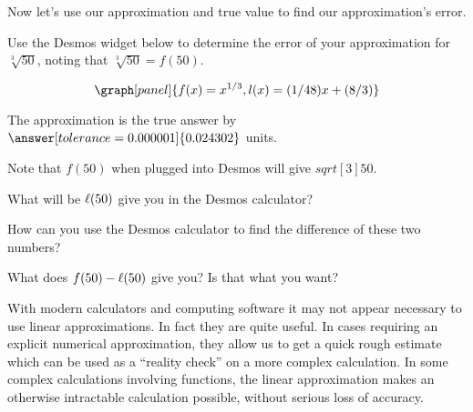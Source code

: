 \documentclass[handout,nooutcomes]{ximera}
\begin{document}
\begin{example}
\begin{explanation}
Now let's use our approximation and true value to find our approximation's error.


Use the Desmos widget below to determine the error of your approximation for $\sqrt[3]{50}$, noting that $\sqrt[3]{50} = f(50)$.

\[
\graph[panel]{f(x) = x^{1/3}, l(x) = (1/48) x + (8/3)}
\]

\begin{question}
The approximation is  the true 
answer by $\answer[tolerance=0.000001]{0.024302}$ units.

\begin{hint}
Note that $f(50)$ when plugged into Desmos will give $
sqrt[3]{50}$.
\end{hint}
\begin{hint}
What will be $\ell(50)$ give you in the Desmos calculator?
\end{hint}
\begin{hint}
How can you use the Desmos calculator to find the difference of these two numbers?
\end{hint}
\begin{hint}
What does $f(50)-\ell(50)$ give you? Is that what you want?
\end{hint}
\end{question}
\end{explanation}
\end{example}


With modern calculators and computing software it may not appear
necessary to use linear approximations. In fact they are quite
useful. In cases requiring an explicit numerical approximation, they
allow us to get a quick rough estimate which can be used as a
``reality check'' on a more complex calculation. In some complex
calculations involving functions, the linear approximation makes an
otherwise intractable calculation possible, without serious loss of
accuracy.
\end{document}
